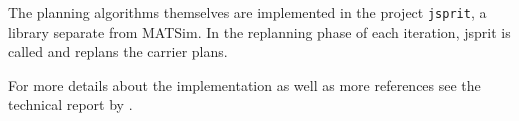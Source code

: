 The planning algorithms themselves are implemented in the project \lstinline|jsprit|, a library separate from MATSim.
In the replanning phase of each iteration, jsprit is called and replans the carrier plans.

For more details about the implementation as well as more references see the technical report by \citet[][]{ZilskeEtAl_TechRep_VSP_2012}.



